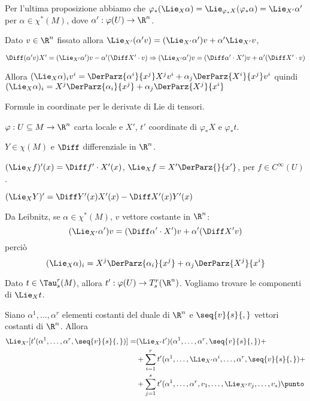 Per l'ultima proposizione abbiamo che $\varphi_*(\Lie_X\alpha) = \Lie_{\varphi_*X}(\varphi_*\alpha) = \Lie_{X'}\alpha'$ per $\alpha\in\chi^*(M)$, dove $\alpha' : \varphi(U)\to\R^n$.

Dato $v\in\R^n$ fissato allora $\Lie_{X'}(\alpha'v) = (\Lie_{X'}\alpha')v + \alpha'\Lie_{X'}v$,

$\Diff (\alpha'v)X' = (\Lie_{X'} \alpha') v - \alpha'(\Diff X' \cdot v) \Rightarrow (\Lie_{X'}\alpha') v = (\Diff \alpha' \cdot X') v + \alpha' (\Diff X' \cdot v)$ 

Allora $(\Lie_X\alpha)_iv^i = \DerParz{\alpha^i}{x^j}X^jv^i + \alpha_j\DerParz{X^i}{x^j}v^i$
quindi $(\Lie_X\alpha)_i = X^j\DerParz{\alpha_i}{x^j} + \alpha_j\DerParz{X^j}{x^i}$




Formule in coordinate per le derivate di Lie di tensori.

$\varphi:U\subseteq M \to \R^n$ carta locale e $X'$, $t'$ coordinate di $\varphi_*X$ e $\varphi_*t$.

$Y\in\chi(M)$ e $\Diff$ differenziale in $\R^n$.

$(\Lie_Xf)'(x) = \Diff f'\cdot X'(x)$, $\Lie_X f = X'\DerParz{}{x'}$, per $f\in C^\infty(U)$.

$(\Lie_XY)' = \Diff Y'(x) X'(x) -\Diff X'(x) Y'(x)$

Da Leibnitz, se $\alpha\in\chi^*(M)$, $v$ vettore costante in $\R^n$:
\begin{equation*}
	(\Lie_{X'}\alpha')v = (\Diff \alpha'\cdot X') v + \alpha' (\Diff X' v)
\end{equation*}
perciò
\begin{equation*}
	(\Lie_X\alpha)_i = X^j \DerParz{\alpha_i}{x^j} + \alpha_j \DerParz{X^j}{x^i}
\end{equation*}

Dato $t\in\Tau_s^r(M)$, allora $t':\varphi(U)\to T_s^r(\R^n)$.
Vogliamo trovare le componenti di $\Lie_Xt$.

Siano $\alpha^1,\ldots,\alpha^r$ elementi costanti del duale di $\R^n$ e $\seq{v}{s}{,}$ vettori costanti di $\R^n$. Allora
\begin{align*}
	\Lie_{X'}[t'(\alpha^1,\ldots,\alpha^r,\seq{v}{s}{,})] =& (\Lie_{X'}t')(\alpha^1,\ldots,\alpha^r,\seq{v}{s}{,}) +\\
	&+\sum_{i=1}^r t'(\alpha^1,\ldots, \Lie_{X'}\alpha^i,\ldots, \alpha^r, \seq{v}{s}{,}) +\\
	&+\sum_{j=1}^s t'(\alpha^1,\ldots,\alpha^r,v_1,\ldots,\Lie_{X'}v_j,\ldots,v_s) \punto
\end{align*}

